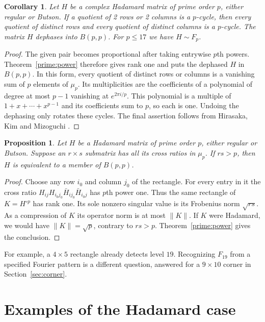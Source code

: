 \documentclass[11pt,a4paper]{article}
\newtheorem{proposition}[theorem]{Proposition}
\newtheorem{corollary}[theorem]{Corollary}
\numberwithin{equation}{section}
\begin{document}
\begin{corollary}\label{prime:onecycle}
Let $H$ be a complex Hadamard matrix of prime order $p$, either regular or Butson. If a quotient of 2 rows or 2 columns is a $p$-cycle, then every quotient of distinct rows and every quotient of distinct columns is a $p$-cycle. The matrix $H$ dephases into $B(p,p)$. For $p\le17$ we have $H\sim F_p$.
\end{corollary}
\begin{proof}
The given pair becomes proportional after taking entrywise $p$th powers. Theorem~\ref{prime:power} therefore gives rank one and puts the dephased $H$ in $B(p,p)$. In this form, every quotient of distinct rows or columns is a vanishing sum of $p$ elements of $\mu_p$. Its multiplicities are the coefficients of a polynomial of degree at most $p-1$ vanishing at $e^{2\pi i/p}$. This polynomial is a multiple of $1+x+\cdots+x^{p-1}$ and its coefficients sum to $p$, so each is one. Undoing the dephasing only rotates these cycles. The final assertion follows from Hirasaka, Kim and Mizoguchi \cite[Theorem~1.1]{hkm}.
\end{proof}

\begin{proposition}\label{prime:rectangle}
Let $H$ be a Hadamard matrix of prime order $p$, either regular or Butson. Suppose an $r\times s$ submatrix has all its cross ratios in $\mu_p$. If $rs>p$, then $H$ is equivalent to a member of $B(p,p)$.
\end{proposition}
\begin{proof}
Choose any row $i_0$ and column $j_0$ of the rectangle. For every entry in it the cross ratio $H_{ij}H_{i_0j_0}\bar H_{ij_0}\bar H_{i_0j}$ has $p$th power one. Thus the same rectangle of $K=H^{\circ p}$ has rank one. Its sole nonzero singular value is its Frobenius norm $\sqrt{rs}$. As a compression of $K$ its operator norm is at most $\|K\|$. If $K$ were Hadamard, we would have $\|K\|=\sqrt p$, contrary to $rs>p$. Theorem~\ref{prime:power} gives the conclusion.
\end{proof}

For example, a $4\times5$ rectangle already detects level $19$. Recognizing $F_{19}$ from a specified Fourier pattern is a different question, answered for a $9\times10$ corner in Section~\ref{sec:corner}.

\section{Examples of the Hadamard case}\label{sec:examples}
\end{document}
